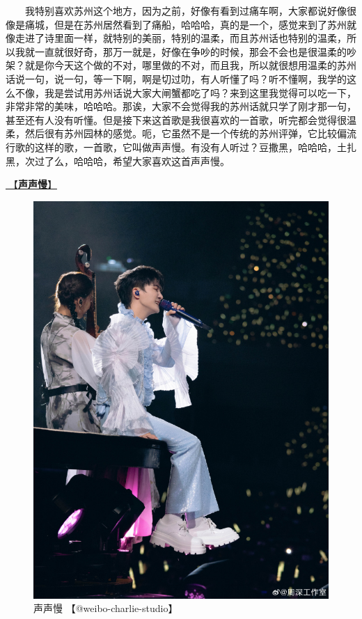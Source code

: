 \documentclass[]{ctexbook}
\begin{document}
  我特别喜欢苏州这个地方，因为之前，好像有看到过痛车啊，大家都说好像很像是痛城，但是在苏州居然看到了痛船，哈哈哈，真的是一个，感觉来到了苏州就像走进了诗里面一样，就特别的美丽，特别的温柔，而且苏州话也特别的温柔，所以我就一直就很好奇，那万一就是，好像在争吵的时候，那会不会也是很温柔的吵架？就是你今天这个做的不对，哪里做的不对，而且我，所以就很想用温柔的苏州话说一句，说一句，等一下啊，啊是切过叻，有人听懂了吗？听不懂啊，我学的这么不像，我是尝试用苏州话说大家大闸蟹都吃了吗？来到这里我觉得可以吃一下，非常非常的美味，哈哈哈。那诶，大家不会觉得我的苏州话就只学了刚才那一句，甚至还有人没有听懂。但是接下来这首歌是我很喜欢的一首歌，听完都会觉得很温柔，然后很有苏州园林的感觉。呃，它虽然不是一个传统的苏州评弹，它比较偏流行歌的这样的歌，一首歌，它叫做声声慢。有没有人听过？豆撒黑，哈哈哈，土扎黑，次过了么，哈哈哈，希望大家喜欢这首声声慢。

\hyperref[say-slowly]{🎵【\textbf{声声慢}】}

\begin{figure}

{\centering \includegraphics[width=400pt]{img/suzhou20241109/004} 

}

\caption{声声慢 【@weibo-charlie-studio】}\label{fig:unnamed-chunk-128}
\end{figure}
\end{document}

